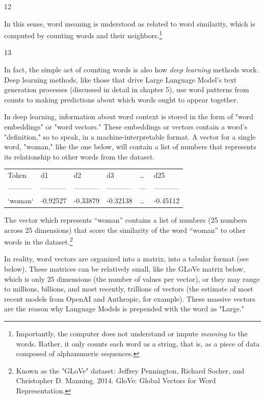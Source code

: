 \documentclass[11pt]{article}
\begin{document}
12

In this sense, word meaning is understood as related to word
similarity, which is computed by counting words and their neighbors.\footnote{Importantly, the computer does not understand or impute
\emph{meaning} to the words. Rather, it only counts each word as a string,
that is, as a piece of data composed of alphanumeric sequences.}

13

In fact, the simple act of counting words is also how \emph{deep learning}
methods work. Deep learning methods, like those that drive Large
Language Model's text generation processes (discussed in detail in
chapter 5), use word patterns from counts to making predictions about
which words ought to appear together.

In deep learning, information about word context is stored in the form
of "word embeddings" or "word vectors." These embeddings or vectors
contain a word's "definition," so to speak, in a machine-interpretable
format. A vector for a single word, "woman," like the one below, will
contain a list of numbers that represents its relationship to other
words from the dataset.

\begin{center}
\begin{tabular}{llllll}
Token & d1 & d2 & d3 & … & d25\\[0pt]
----------- & ----------- & ----------- & ----------- & --- & -----------\\[0pt]
`woman` & -0.92527 & -0.33879 & -0.32138 & … & -0.45112\\[0pt]
\end{tabular}
\end{center}


The vector which represents “woman” contains a list of numbers (25
numbers across 25 dimensions) that score the similarity of the word
“woman” to other words in the dataset.\footnote{Known as the "GLoVe" dataset: Jeffrey Pennington, Richard
Socher, and Christopher D. Manning. 2014. GloVe: Global Vectors for
Word Representation.} 

In reality, word vectors are organized into a matrix, into a tabular
format (see below). These matrices can be relatively small, like the
GLoVe matrix below, which is only 25 dimensions (the number of values
per vector), or they may range to millions, billions, and most
recently, trillions of vectors (the estimate of most recent models
from OpenAI and Anthropic, for example). These massive vectors are the
reason why Language Models is prepended with the word as "Large."
\end{document}
